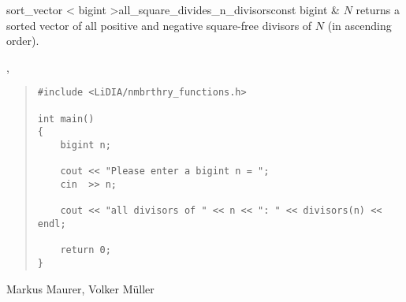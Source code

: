 \begin{fcode}{sort_vector < bigint >}{all_square_divides_n_divisors}{const bigint & $N$}
  returns a sorted vector of all positive and negative square-free divisors of $N$ (in ascending
  order).
\end{fcode}



\SEEALSO

, 



\EXAMPLES

\begin{quote}
\begin{verbatim}
#include <LiDIA/nmbrthry_functions.h>

int main()
{
    bigint n;

    cout << "Please enter a bigint n = ";
    cin  >> n;

    cout << "all divisors of " << n << ": " << divisors(n) << endl;

    return 0;
}
\end{verbatim}
\end{quote}



\AUTHOR

Markus Maurer, Volker M\"uller
